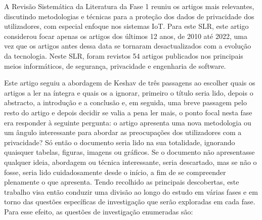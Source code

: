 \documentclass[conference]{IEEEtran}
\begin{document}
\par
A Revisão Sistemática da Literatura da Fase 1 reuniu os artigos mais relevantes,
discutindo metodologias e técnicas para a proteção dos dados de privacidade
dos utilizadores, com especial enfoque nos sistemas IoT. Para este SLR,
este artigo considerou focar apenas os artigos dos últimos 12 anos, de 2010
até 2022, uma vez que os artigos antes dessa data se tornaram desactualizados
com a evolução da tecnologia. Neste SLR, foram revistos 54 artigos publicados
nos principais meios informáticos, de segurança, privacidade e engenharia de
software.


Este artigo seguiu a abordagem de Keshav de três passagens \cite{KeshavHow}
ao escolher quais os artigos a ler na íntegra e quais os a ignorar, primeiro
o título seria lido, depois o abstracto, a introdução e a conclusão e, em
seguida, uma breve passagem pelo resto do artigo e depois decidir se valia
a pena ler mais, o ponto focal nesta fase era responder à seguinte pergunta:
o artigo apresenta uma nova metodologia ou um ângulo interessante para abordar
as preocupações dos utilizadores com a privacidade? Só então o documento seria
lido na sua totalidade, ignorando quaisquer tabelas, figuras, imagens ou gráficos.
Se o documento não apresentasse qualquer ideia, abordagem ou técnica interessante,
seria descartado, mas se não o fosse, seria lido cuidadosamente desde o início,
a fim de se compreender plenamente o que apresenta. Tendo recolhido as principais
descobertas, este trabalho visa então conduzir uma divisão ao longo do estudo em
várias fases e em torno das questões específicas de investigação que serão exploradas
em cada fase. Para esse efeito, as questões de investigação enumeradas são:
\end{document}
